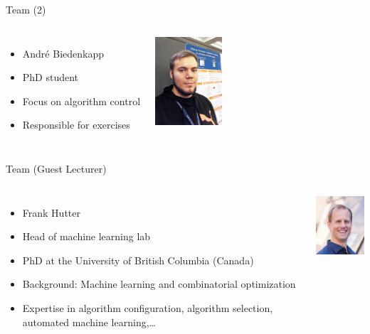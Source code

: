 \begin{frame}[c]{Team (2)}

\begin{columns}[T]
\begin{itemize}
  \item Andr\'e Biedenkapp
  \item PhD student
  \item Focus on algorithm control
  \item Responsible for exercises
\end{itemize}

\includegraphics[width=6.7em]{images/team/biedenkapp}
\end{columns}

\end{frame}
\begin{frame}[c]{Team (Guest Lecturer)}

\begin{columns}[T]
\begin{itemize}
  \item Frank Hutter
  \item Head of machine learning lab
  \item PhD at the University of British Columbia (Canada)
  \item Background: Machine learning and combinatorial optimization
	\item Expertise in algorithm configuration, algorithm selection, automated machine learning,\ldots
\end{itemize}
\vspace*{0.7cm}
\includegraphics[width=6.7em]{images/team/frank_small}
\end{columns}

\end{frame}
